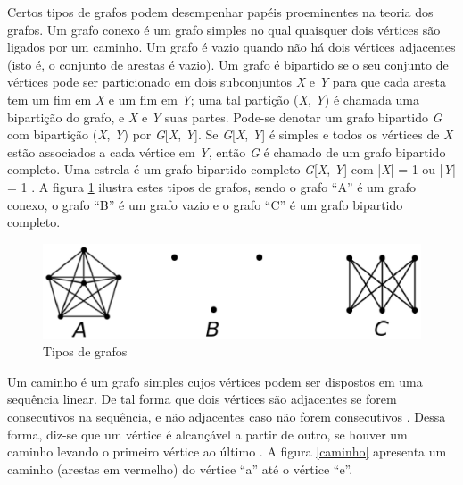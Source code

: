 \begin{apendicesenv}
Certos tipos de grafos podem desempenhar papéis proeminentes na teoria dos grafos. Um grafo conexo é um grafo simples no qual quaisquer dois vértices são ligados por um caminho. Um grafo é vazio quando não há dois vértices adjacentes (isto é, o conjunto de arestas é vazio). Um grafo é bipartido se o seu conjunto de vértices pode ser particionado em dois subconjuntos \textit{X} e \textit{Y} para que cada aresta tem um fim em \textit{X} e um fim em \textit{Y}; uma tal partição (\textit{X}, \textit{Y}) é chamada uma bipartição do grafo, e \textit{X} e \textit{Y} suas partes. Pode-se denotar um grafo bipartido \textit{G} com bipartição (\textit{X}, \textit{Y}) por \textit{G}[\textit{X}, \textit{Y}]. Se \textit{G}[\textit{X}, \textit{Y}] é simples e todos os vértices de \textit{X} estão associados a cada vértice em \textit{Y}, então \textit{G} é chamado de um grafo bipartido completo. Uma estrela é um grafo bipartido completo \textit{G}[\textit{X}, \textit{Y}] com |\textit{X}| = 1 ou |\textit{Y}| = 1 \cite{Diestel:1997}.  A figura \ref{tipos_grafos} ilustra estes tipos de grafos, sendo o grafo ``A'' é um grafo conexo, o grafo ``B'' é um grafo vazio e o grafo ``C'' é um grafo bipartido completo.

\begin{figure}[!h]
	\centering
	\includegraphics[scale=0.4]{figuras/capitulo2/tipos_grafos.eps}
	\caption[Tipos de grafos]{Tipos de grafos \cite{Diestel:1997}}
	\label{tipos_grafos}
\end{figure}

Um caminho é um grafo simples cujos vértices podem ser dispostos em uma sequência linear. De tal forma que dois vértices são adjacentes se forem consecutivos na sequência, e não adjacentes caso não forem consecutivos \cite{Bondy:2007}. Dessa forma, diz-se que um vértice é alcançável a partir de outro, se houver um caminho levando o primeiro vértice ao último \cite{Costa:2011}. A figura \ref{caminho} apresenta um caminho (arestas em vermelho) do vértice ``a'' até o vértice ``e''.


\end{apendicesenv}
